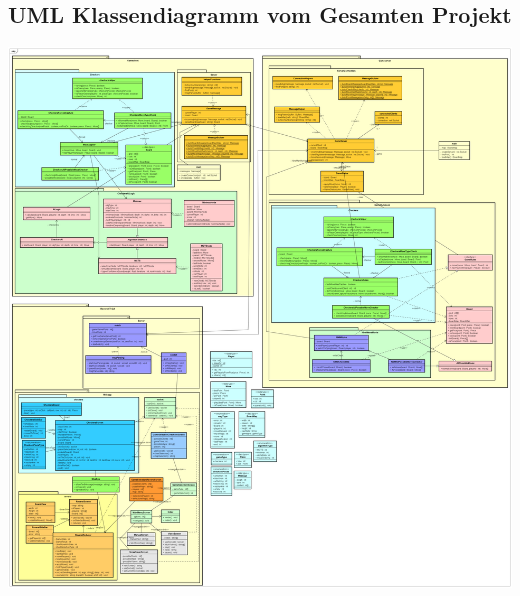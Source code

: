 \documentclass[12pt,a4paper,bibliography=totocnumbered,listof=totocnumbered]{article}
\begin{document}
\begin{appendix}
\section{UML Klassendiagramm vom Gesamten Projekt}
\label{apx:AllClassDiagrams}
\vspace{1em}
\begin{minipage}{\linewidth}
	\centering
	\includegraphics[width=1.0\linewidth]{pics/AllClassDiagrams.png}
\end{minipage}



\end{appendix}


\pagebreak
\end{document}
